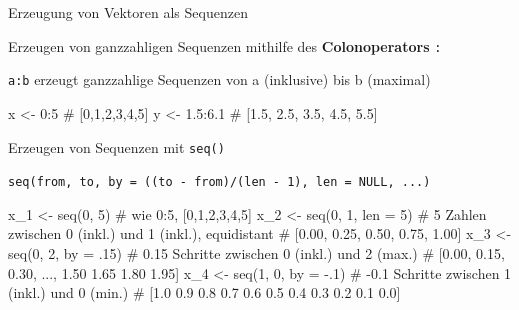 \documentclass[
  8pt,
  ignorenonframetext,
]{beamer}
\newenvironment{Shaded}{\begin{snugshade}}{\end{snugshade}}
\newcommand{\AttributeTok}[1]{\textcolor[rgb]{0.40,0.45,0.13}{#1}}
\newcommand{\CommentTok}[1]{\textcolor[rgb]{0.37,0.37,0.37}{#1}}
\newcommand{\DecValTok}[1]{\textcolor[rgb]{0.68,0.00,0.00}{#1}}
\newcommand{\FloatTok}[1]{\textcolor[rgb]{0.68,0.00,0.00}{#1}}
\newcommand{\FunctionTok}[1]{\textcolor[rgb]{0.28,0.35,0.67}{#1}}
\newcommand{\NormalTok}[1]{\textcolor[rgb]{0.00,0.23,0.31}{#1}}
\newcommand{\OtherTok}[1]{\textcolor[rgb]{0.00,0.23,0.31}{#1}}
\newcommand{\SpecialCharTok}[1]{\textcolor[rgb]{0.37,0.37,0.37}{#1}}
\begin{document}
\begin{frame}[fragile]{Erzeugung von Vektoren als Sequenzen}
\protect\hypertarget{erzeugung-von-vektoren-als-sequenzen}{}
\small

Erzeugen von ganzzahligen Sequenzen mithilfe des \textbf{Colonoperators}
\texttt{:}

\texttt{a:b} erzeugt ganzzahlige Sequenzen von a (inklusive) bis b
(maximal)

\tiny

\begin{Shaded}
\begin{Highlighting}[]
\NormalTok{x }\OtherTok{\textless{}{-}} \DecValTok{0}\SpecialCharTok{:}\DecValTok{5}                         \CommentTok{\# [0,1,2,3,4,5]}
\NormalTok{y }\OtherTok{\textless{}{-}} \FloatTok{1.5}\SpecialCharTok{:}\FloatTok{6.1}                     \CommentTok{\# [1.5, 2.5, 3.5, 4.5, 5.5]}
\end{Highlighting}
\end{Shaded}

\small

Erzeugen von Sequenzen mit \texttt{seq()}

\texttt{seq(from,\ to,\ by\ =\ ((to\ -\ from)/(len\ -\ 1),\ len\ =\ NULL,\ ...)}

\tiny

\begin{Shaded}
\begin{Highlighting}[]
\NormalTok{x\_1 }\OtherTok{\textless{}{-}} \FunctionTok{seq}\NormalTok{(}\DecValTok{0}\NormalTok{, }\DecValTok{5}\NormalTok{)                 }\CommentTok{\# wie 0:5, [0,1,2,3,4,5]}
\NormalTok{x\_2 }\OtherTok{\textless{}{-}} \FunctionTok{seq}\NormalTok{(}\DecValTok{0}\NormalTok{, }\DecValTok{1}\NormalTok{, }\AttributeTok{len =} \DecValTok{5}\NormalTok{)        }\CommentTok{\# 5 Zahlen zwischen 0 (inkl.) und 1 (inkl.), equidistant}
                                 \CommentTok{\# [0.00, 0.25, 0.50, 0.75, 1.00]}
\NormalTok{x\_3 }\OtherTok{\textless{}{-}} \FunctionTok{seq}\NormalTok{(}\DecValTok{0}\NormalTok{, }\DecValTok{2}\NormalTok{, }\AttributeTok{by =}\NormalTok{ .}\DecValTok{15}\NormalTok{)       }\CommentTok{\# 0.15 Schritte zwischen 0 (inkl.) und 2 (max.)}
                                 \CommentTok{\# [0.00, 0.15, 0.30, ..., 1.50 1.65 1.80 1.95]}
\NormalTok{x\_4 }\OtherTok{\textless{}{-}} \FunctionTok{seq}\NormalTok{(}\DecValTok{1}\NormalTok{, }\DecValTok{0}\NormalTok{, }\AttributeTok{by =} \SpecialCharTok{{-}}\NormalTok{.}\DecValTok{1}\NormalTok{)       }\CommentTok{\# {-}0.1 Schritte zwischen 1 (inkl.) und 0 (min.)}
                                 \CommentTok{\# [1.0 0.9 0.8 0.7 0.6 0.5 0.4 0.3 0.2 0.1 0.0]}
\end{Highlighting}
\end{Shaded}


\end{frame}
\end{document}
